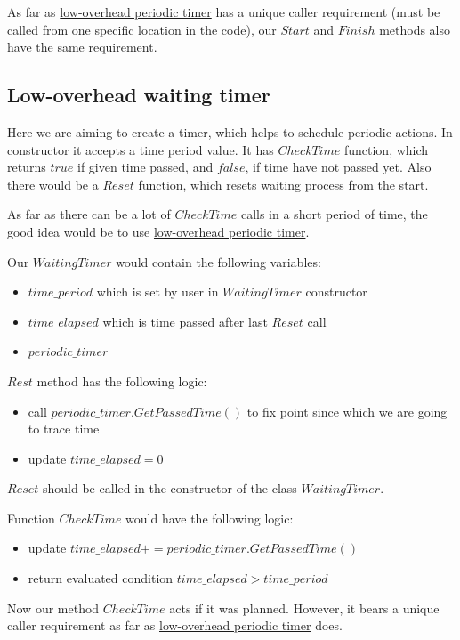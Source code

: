 \documentclass{article}
\begin{document}
As far as \hyperref[subsec:low_overhead_periodic_timer]{low-overhead periodic timer} has a unique caller requirement (must be called from one specific location in the code), our $Start$ and $Finish$ methods also have the same requirement.

\subsection{Low-overhead waiting timer}
Here we are aiming to create a timer, which helps to schedule periodic actions. In constructor it accepts a time period value. It has $CheckTime$ function, which returns $true$ if given time passed, and $false$, if time have not passed yet. Also there would be a $Reset$ function, which resets waiting process from the start.

As far as there can be a lot of $CheckTime$ calls in a short period of time, the good idea would be to use \hyperref[subsec:low_overhead_periodic_timer]{low-overhead periodic timer}.

Our $WaitingTimer$ would contain the following variables:
\begin{itemize}
	\item $time\_period$ which is set by user in $WaitingTimer$ constructor
	\item $time\_elapsed$ which is time passed after last $Reset$ call
	\item $periodic\_timer$
\end{itemize}

$Rest$ method has the following logic:
\begin{itemize}
	\item call $periodic\_timer.GetPassedTime()$ to fix point since which we are going to trace time
	\item update $time\_elapsed = 0$
\end{itemize}

$Reset$ should be called in the constructor of the class $WaitingTimer$.

Function $CheckTime$ would have the following logic:
\begin{itemize}
	\item update $time\_elapsed += periodic\_timer.GetPassedTime()$
	\item return evaluated condition $time\_elapsed > time\_period$
\end{itemize}

Now our method $CheckTime$ acts if it was planned. However, it bears a unique caller requirement as far as \hyperref[subsec:low_overhead_periodic_timer]{low-overhead periodic timer} does.
\newpage
\end{document}
